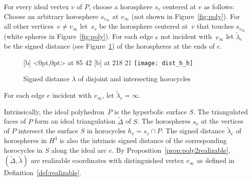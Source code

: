 \documentclass[a4paper, 11pt]{article}
\newcommand{\Deltil}{\widetilde{\Delta}}
\newcommand{\lamtil}{\tilde{\lambda}}
\theoremstyle{plain}
\theoremstyle{definition}
\begin{document}
For every ideal vertex $v$ of $P$, choose a horosphere $s_{v}$
centered at $v$ as follows: Choose an arbitrary horosphere
$s_{v_{\infty}}$ at $v_{\infty}$ (not shown in
Figure~\ref{fig:poly}). For all other vertices~$v\not=v_{\infty}$
let~$s_{v}$ be the horosphere centered at~$v$ that touches
$s_{v_{\infty}}$ (white spheres in Figure~\ref{fig:poly}).  For each
edge $e$ not incident with~$v_{\infty}$ let $\lamtil_{e}$ be the
signed distance (see Figure~\ref{fig:signdist}) of the horospheres at the
ends of $e$.
\begin{figure}
  \centering
  \small\hair 3pt 
   [b] <0pt,0pt> at 85 42 
   [b] at 218 21
  \endlabellist
  \centering
  \texttt{[image: dist\_h\_h]}
  \caption{Signed distance $\lambda$ of disjoint and
    intersecting horocycles}
  \label{fig:signdist}
\end{figure}
For each edge $e$ incident with $v_{\infty}$, let $\lamtil_{e}=\infty$.

Intrinsically, the ideal polyhedron~$P$ is the hyperbolic surface
$S$. The triangulated faces of $P$ form an ideal triangulation
$\Deltil$ of $S$. The horospheres $s_{v}$ at the vertices of $P$
intersect the surface $S$ in horocycles $h_{v}=s_{v}\cap P$. The
signed distance $\lamtil_{e}$ of horospheres in $H^{3}$ is also the
intrinsic signed distance of the corresponding horocycles in $S$ along
the ideal arc $e$. By Proposition~\ref{prop:poly2realizable},
$(\Deltil,\lamtil)$ are realizable coordinates with distinguished
vertex $v_{\infty}$ as defined in Definition~\ref{def:realizable}.
\end{document}
